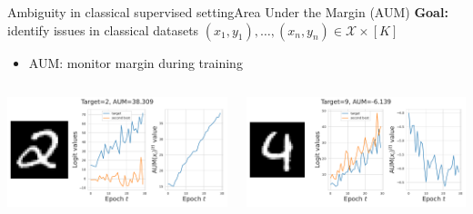 \begin{frame}{Ambiguity in classical supervised setting}{Area Under the Margin (AUM)}
    \textbf{Goal:} identify issues in classical datasets $(x_1, y_1),\dots,(x_n, y_n)\in \mathcal{X}\times [K]$
\begin{itemize}
    \item AUM: monitor margin during training
\end{itemize}
\vspace{.5cm}
\begin{columns}
    \begin{column}{.45\textwidth}
        \includegraphics[width=\textwidth]{./../chapters/images/high_aum_mnist.pdf}
    \end{column}
    \begin{column}{.45\textwidth}
        \includegraphics[width=\textwidth]{./../chapters/images/mid_aum_mnist.pdf}
    \end{column}
\end{columns}
\end{frame}
